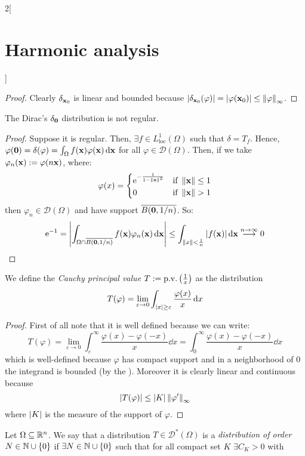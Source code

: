 \documentclass[../../../main_math.tex]{subfiles}
\begin{document}
\begin{multicols}{2}[\section{Harmonic analysis}]
\begin{proposition}
  \end{proposition}
  \begin{proof}
    Clearly $\delta_{\boldsymbol{\mathrm{x}}_0}$ is linear and bounded because $\abs{\delta_{\boldsymbol{\mathrm{x}}_0}(\varphi)}=\abs{\varphi(\boldsymbol{\mathrm{x}}_0)}\leq \left\|\varphi\right\|_\infty$.
  \end{proof}
  \begin{lemma}
    The Dirac's $\delta_{\boldsymbol{\mathrm{0}}}$ distribution is not regular.
  \end{lemma}
  \begin{proof}
    Suppose it is regular. Then, $\exists f\in L_{\mathrm{loc}}^1(\Omega)$ such that $\delta=T_f$. Hence, $\varphi(\boldsymbol{\mathrm{0}})=\delta(\varphi)=\int_\Omega f(\boldsymbol{\mathrm{x}})\varphi(\boldsymbol{\mathrm{x}})\dd{\boldsymbol{\mathrm{x}}}$ for all $\varphi\in\mathcal{D}(\Omega)$. Then, if we take $\varphi_n(\boldsymbol{\mathrm{x}}):=\varphi(n\boldsymbol{\mathrm{x}})$, where:
    $$\varphi(x)=\begin{cases}
        \exp{-\frac{1}{1-\norm{\vf{x}}^2}} & \text{if } \norm{\vf{x}}\leq 1 \\
        0                                  & \text{if } \norm{\vf{x}}> 1
      \end{cases}
    $$
    then $\varphi_n\in\mathcal{D}(\Omega)$ and have support $\overline{B(\boldsymbol{\mathrm{0}},1/n)}$. So:
    $$\mathrm{e}^{-1}=\abs{\int_{\Omega\cap \overline{B(\boldsymbol{\mathrm{0}},1/n)}} f(\boldsymbol{\mathrm{x}})\varphi_n(\boldsymbol{\mathrm{x}})\dd{\boldsymbol{\mathrm{x}}}}\leq \int_{\left\|x\right\|<\frac{1}{n}}\abs{f(\boldsymbol{\mathrm{x}})}\dd{\boldsymbol{\mathrm{x}}}\overset{n\to\infty}{\longrightarrow}0$$
  \end{proof}
  \begin{proposition}
    We define the \emph{Cauchy principal value} $T:=\mathrm{p.v.}\left(\frac{1}{x}\right)$ as the distribution
    $$T(\varphi)=\lim_{\varepsilon\to 0}\int_{\abs{x}\geq \varepsilon}\frac{\varphi(x)}{x}\dd{x}$$
  \end{proposition}
  \begin{proof}
    First of all note that it is well defined because we can write:
    $$T(\varphi)=\lim_{\varepsilon\to 0}\int_{\varepsilon}^\infty\frac{\varphi(x)-\varphi(-x)}{x}\dd{x}=\int_{0}^\infty\frac{\varphi(x)-\varphi(-x)}{x}\dd{x}$$
    which is well-defined because $\varphi$ has compact support and in a neighborhood of $0$ the integrand is bounded (by the ). Moreover it is clearly linear and continuous because $$\abs{T(\varphi)}\leq \m{K} \norm{\varphi'}_\infty$$
    where $\abs{K}$ is the measure of the support of $\varphi$.
  \end{proof}
  \begin{definition}
    Let $\Omega\subseteq \mathbb{R}^n$. We say that a distribution $T\in\mathcal{D}^*(\Omega)$ is a \emph{distribution of order $N\in\mathbb{N}\cup\{0\}$} if $\exists N\in\mathbb{N}\cup\{0\}$ such that for all compact set $K$ $\exists C_K>0$ with

\end{definition}
\end{multicols}
\end{document}
